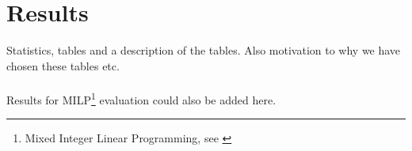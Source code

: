 \chapter{Results}
Statistics, tables and a description of the tables. Also motivation to why we have chosen these tables etc.\\\\
Results for MILP\footnote{Mixed Integer Linear Programming, see \cite{paper3}} evaluation could also be added here.
